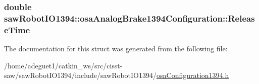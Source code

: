 \hypertarget{structsaw_robot_i_o1394_1_1osa_analog_brake1394_configuration_aa948092dd9e95e724395762b36279c1d}{
\subsubsection[{Release\-Time}]{\setlength{\rightskip}{0pt plus 5cm}double saw\-Robot\-I\-O1394\-::osa\-Analog\-Brake1394\-Configuration\-::\-Release\-Time}}\label{structsaw_robot_i_o1394_1_1osa_analog_brake1394_configuration_aa948092dd9e95e724395762b36279c1d}


The documentation for this struct was generated from the following file\-:\begin{DoxyCompactItemize}
\item 
/home/adeguet1/catkin\-\_\-ws/src/cisst-\/saw/saw\-Robot\-I\-O1394/include/saw\-Robot\-I\-O1394/\hyperlink{osa_configuration1394_8h}{osa\-Configuration1394.\-h}\end{DoxyCompactItemize}
